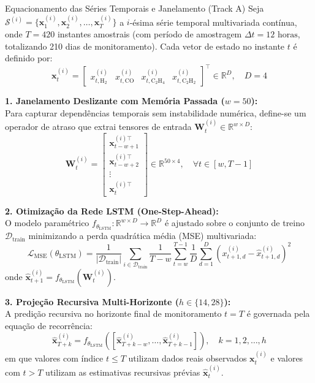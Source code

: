 \documentclass[11pt,a4paper]{article}
\begin{document}
\begin{mathBox}{Equacionamento das Séries Temporais e Janelamento (Track A)}
Seja $\mathcal{S}^{(i)} = \{ \mathbf{x}_1^{(i)}, \mathbf{x}_2^{(i)}, \dots, \mathbf{x}_T^{(i)} \}$ a $i$-ésima série temporal multivariada contínua, onde $T = 420$ instantes amostrais (com período de amostragem $\Delta t = 12\text{ horas}$, totalizando 210 dias de monitoramento). Cada vetor de estado no instante $t$ é definido por:
\begin{equation}
  \mathbf{x}_t^{(i)} = \begin{bmatrix} x_{t, \text{H}_2}^{(i)} & x_{t, \text{CO}}^{(i)} & x_{t, \text{C}_2\text{H}_4}^{(i)} & x_{t, \text{C}_2\text{H}_2}^{(i)} \end{bmatrix}^\top \in \mathbb{R}^D, \quad D=4
\end{equation}

\textbf{1. Janelamento Deslizante com Memória Passada ($w=50$):}\\
Para capturar dependências temporais sem instabilidade numérica, define-se um operador de atraso que extrai tensores de entrada $\mathbf{W}_t^{(i)} \in \mathbb{R}^{w \times D}$:
\begin{equation}
  \mathbf{W}_t^{(i)} = \begin{bmatrix} \mathbf{x}_{t-w+1}^{(i)\top} \\ \mathbf{x}_{t-w+2}^{(i)\top} \\ \vdots \\ \mathbf{x}_t^{(i)\top} \end{bmatrix} \in \mathbb{R}^{50 \times 4}, \quad \forall t \in [w, T-1]
\end{equation}

\textbf{2. Otimização da Rede LSTM (One-Step-Ahead):}\\
O modelo paramétrico $f_{\theta_{\text{LSTM}}}: \mathbb{R}^{w \times D} \to \mathbb{R}^D$ é ajustado sobre o conjunto de treino $\mathcal{D}_{\text{train}}$ minimizando a perda quadrática média (MSE) multivariada:
\begin{equation}
  \mathcal{L}_{\text{MSE}}(\theta_{\text{LSTM}}) = \frac{1}{|\mathcal{D}_{\text{train}}|} \sum_{i \in \mathcal{D}_{\text{train}}} \frac{1}{T - w} \sum_{t=w}^{T-1} \frac{1}{D} \sum_{d=1}^D \left( x_{t+1, d}^{(i)} - \hat{x}_{t+1, d}^{(i)} \right)^2
\end{equation}
onde $\hat{\mathbf{x}}_{t+1}^{(i)} = f_{\theta_{\text{LSTM}}}(\mathbf{W}_t^{(i)})$.

\textbf{3. Projeção Recursiva Multi-Horizonte ($h \in \{14, 28\}$):}\\
A predição recursiva no horizonte final de monitoramento $t = T$ é governada pela equação de recorrência:
\begin{equation}
  \hat{\mathbf{x}}_{T+k}^{(i)} = f_{\theta_{\text{LSTM}}}\left( \left[ \hat{\mathbf{x}}_{T+k-w}^{(i)}, \dots, \hat{\mathbf{x}}_{T+k-1}^{(i)} \right] \right), \quad k = 1, 2, \dots, h
\end{equation}
em que valores com índice $t \le T$ utilizam dados reais observados $\mathbf{x}_t^{(i)}$ e valores com $t > T$ utilizam as estimativas recursivas prévias $\hat{\mathbf{x}}_t^{(i)}$.
\end{mathBox}
\end{document}
